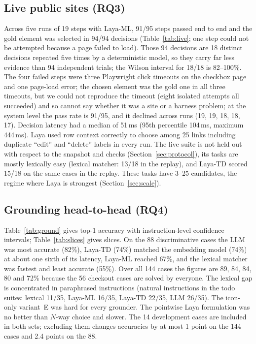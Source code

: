 \documentclass[11pt,a4paper]{article}
\begin{document}
\subsection{Live public sites (RQ3)}
Across five runs of 19 steps with Laya-ML, 91/95 steps passed end to end and the gold element was selected in 94/94 decisions (Table~\ref{tab:live}; one step could not be attempted because a page failed to load). Those 94 decisions are 18 distinct decisions repeated five times by a deterministic model, so they carry far less evidence than 94 independent trials; the Wilson interval for 18/18 is 82--100\%. The four failed steps were three Playwright click timeouts on the checkbox page and one page-load error; the chosen element was the gold one in all three timeouts, but we could not reproduce the timeout (eight isolated attempts all succeeded) and so cannot say whether it was a site or a harness problem; at the system level the pass rate is 91/95, and it declined across runs (19, 19, 18, 18, 17). Decision latency had a median of 51\,ms (95th percentile 104\,ms, maximum 444\,ms). Laya used row context correctly to choose among 25 links including duplicate ``edit'' and ``delete'' labels in every run. The live suite is not held out with respect to the snapshot and checks (Section~\ref{sec:protocol}), its tasks are mostly lexically easy (lexical matcher: 13/18 in the replay), and Laya-TD scored 15/18 on the same cases in the replay. These tasks have 3--25 candidates, the regime where Laya is strongest (Section~\ref{sec:scale}).

\begin{table}[t]\centering\small

\caption{Live suite (Laya-ML, five runs). ``Gold chosen'' counts decisions in which Laya selected the gold element.}\label{tab:live}
\end{table}

\subsection{Grounding head-to-head (RQ4)}
Table~\ref{tab:ground} gives top-1 accuracy with instruction-level confidence intervals; Table~\ref{tab:slices} gives slices. On the 88 discriminative cases the LLM was most accurate (82\%), Laya-TD (74\%) matched the embedding model (74\%) at about one sixth of its latency, Laya-ML reached 67\%, and the lexical matcher was fastest and least accurate (55\%). Over all 144 cases the figures are 89, 84, 84, 80 and 72\% because the 56 checkout cases are solved by everyone. The lexical gap is concentrated in paraphrased instructions (natural instructions in the todo suites: lexical 11/35, Laya-ML 16/35, Laya-TD 22/35, LLM 26/35). The icon-only variant~E was hard for every grounder. The pointwise Laya formulation was no better than $N$-way choice and slower. The 14 development cases are included in both sets; excluding them changes accuracies by at most 1 point on the 144 cases and 2.4 points on the 88.
\end{document}
